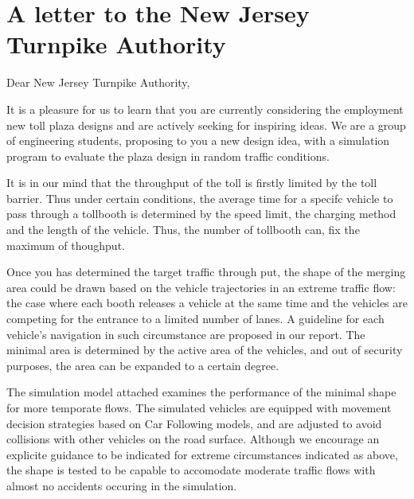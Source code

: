 \documentclass{mcmthesis}
\begin{document}
\maketitle
\tableofcontents
\clearpage








\section*{A letter to the New Jersey Turnpike Authority}
\vspace{5ex}
Dear New Jersey Turnpike Authority,	\vspace{3ex}
  		  
It is a pleasure for us to learn that you are currently considering the employment new toll plaza designs and are actively seeking for inspiring ideas. We are a group of engineering students, proposing to you a new design idea, with a simulation program to evaluate the plaza design in random traffic conditions. 		 
  		  
It is in our mind that the throughput of the toll is firstly limited by the toll barrier. Thus under certain conditions, the average time for a specifc vehicle to pass through a tollbooth is determined by the speed limit, the charging method and the length of the vehicle. Thus, the number of tollbooth can, fix the maximum of thoughput. 		
  		  
Once you has determined the target traffic through put, the shape of the merging area could be drawn based on the vehicle trajectories in an extreme traffic flow: the case where each booth releases a vehicle at the same time and the vehicles are competing for the entrance to a limited number of lanes. A guideline for each vehicle's navigation in such circumstance are proposed in our report. The minimal area is determined by the active area of the vehicles, and out of security purposes, the area can be expanded to a certain degree.	
  		  
The simulation model attached examines the performance of the minimal shape for more temporate flows. The simulated vehicles are equipped with movement decision strategies based on Car Following models, and are adjusted to avoid collisions with other vehicles on the road surface. Although we encourage an explicite guidance to be indicated for extreme circumstances indicated as above, the shape is tested to be capable to accomodate moderate traffic flows with almost no accidents occuring in the simulation.	
  		  
\end{document}
